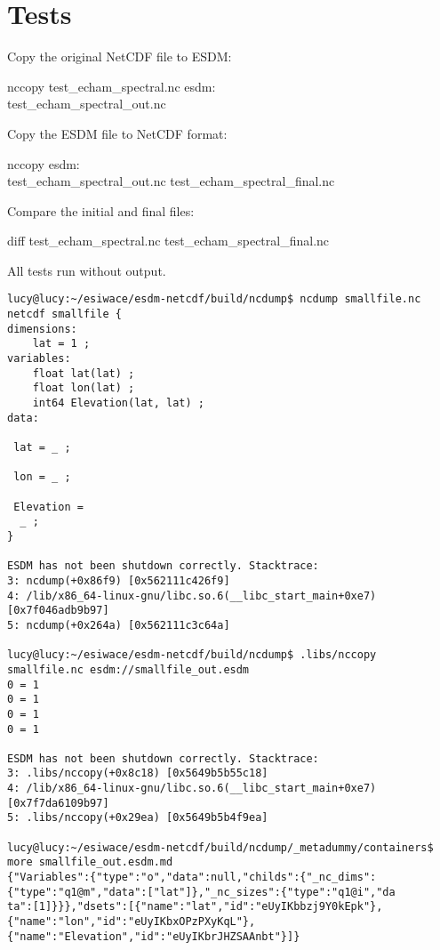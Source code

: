 {\section{Tests}


Copy the original NetCDF file to ESDM:

\begin{framed}
nccopy test\_echam\_spectral.nc esdm:\\test\_echam\_spectral\_out.nc
\end{framed}

Copy the ESDM file to NetCDF format:

\begin{framed}
nccopy esdm:\\test\_echam\_spectral\_out.nc test\_echam\_spectral\_final.nc
\end{framed}

Compare the initial and final files:

\begin{framed}
diff test\_echam\_spectral.nc test\_echam\_spectral\_final.nc
\end{framed}

All tests run without output.

\begin{verbatim}
lucy@lucy:~/esiwace/esdm-netcdf/build/ncdump$ ncdump smallfile.nc
netcdf smallfile {
dimensions:
	lat = 1 ;
variables:
	float lat(lat) ;
	float lon(lat) ;
	int64 Elevation(lat, lat) ;
data:

 lat = _ ;

 lon = _ ;

 Elevation =
  _ ;
}

ESDM has not been shutdown correctly. Stacktrace:
3: ncdump(+0x86f9) [0x562111c426f9]
4: /lib/x86_64-linux-gnu/libc.so.6(__libc_start_main+0xe7) [0x7f046adb9b97]
5: ncdump(+0x264a) [0x562111c3c64a]

lucy@lucy:~/esiwace/esdm-netcdf/build/ncdump$ .libs/nccopy smallfile.nc esdm://smallfile_out.esdm
0 = 1
0 = 1
0 = 1
0 = 1

ESDM has not been shutdown correctly. Stacktrace:
3: .libs/nccopy(+0x8c18) [0x5649b5b55c18]
4: /lib/x86_64-linux-gnu/libc.so.6(__libc_start_main+0xe7) [0x7f7da6109b97]
5: .libs/nccopy(+0x29ea) [0x5649b5b4f9ea]

lucy@lucy:~/esiwace/esdm-netcdf/build/ncdump/_metadummy/containers$ more smallfile_out.esdm.md
{"Variables":{"type":"o","data":null,"childs":{"_nc_dims":{"type":"q1@m","data":["lat"]},"_nc_sizes":{"type":"q1@i","da
ta":[1]}}},"dsets":[{"name":"lat","id":"eUyIKbbzj9Y0kEpk"},
{"name":"lon","id":"eUyIKbxOPzPXyKqL"},
{"name":"Elevation","id":"eUyIKbrJHZSAAnbt"}]}


\end{verbatim}}
